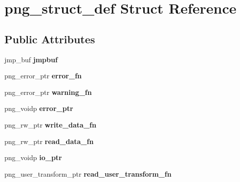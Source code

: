 \hypertarget{structpng__struct__def}{\section{png\+\_\+struct\+\_\+def Struct Reference}
\label{structpng__struct__def}
}
\subsection*{Public Attributes}
\begin{DoxyCompactItemize}
\item 
\hypertarget{structpng__struct__def_a612a97110a82e8481d68bb7ef47f6224}{jmp\+\_\+buf {\bfseries jmpbuf}}\label{structpng__struct__def_a612a97110a82e8481d68bb7ef47f6224}

\item 
\hypertarget{structpng__struct__def_a2cc5bd1cf507373992a61cf725a730cd}{png\+\_\+error\+\_\+ptr {\bfseries error\+\_\+fn}}\label{structpng__struct__def_a2cc5bd1cf507373992a61cf725a730cd}

\item 
\hypertarget{structpng__struct__def_a43bba3b1d80a9a21ea9d4d55da13eafd}{png\+\_\+error\+\_\+ptr {\bfseries warning\+\_\+fn}}\label{structpng__struct__def_a43bba3b1d80a9a21ea9d4d55da13eafd}

\item 
\hypertarget{structpng__struct__def_a06837611b772a6a44cf6306ea08d40a8}{png\+\_\+voidp {\bfseries error\+\_\+ptr}}\label{structpng__struct__def_a06837611b772a6a44cf6306ea08d40a8}

\item 
\hypertarget{structpng__struct__def_acc53cd87f0ffc4d1f67da7e10a94af39}{png\+\_\+rw\+\_\+ptr {\bfseries write\+\_\+data\+\_\+fn}}\label{structpng__struct__def_acc53cd87f0ffc4d1f67da7e10a94af39}

\item 
\hypertarget{structpng__struct__def_a83804076437d1587fab947c056bb56ae}{png\+\_\+rw\+\_\+ptr {\bfseries read\+\_\+data\+\_\+fn}}\label{structpng__struct__def_a83804076437d1587fab947c056bb56ae}

\item 
\hypertarget{structpng__struct__def_a996f6f8aaa00ede3bb147714ee7c480e}{png\+\_\+voidp {\bfseries io\+\_\+ptr}}\label{structpng__struct__def_a996f6f8aaa00ede3bb147714ee7c480e}

\item 
\hypertarget{structpng__struct__def_a7fd40a67ea39220221977700bce18dac}{png\+\_\+user\+\_\+transform\+\_\+ptr {\bfseries read\+\_\+user\+\_\+transform\+\_\+fn}}\label{structpng__struct__def_a7fd40a67ea39220221977700bce18dac}


\end{DoxyCompactItemize}
